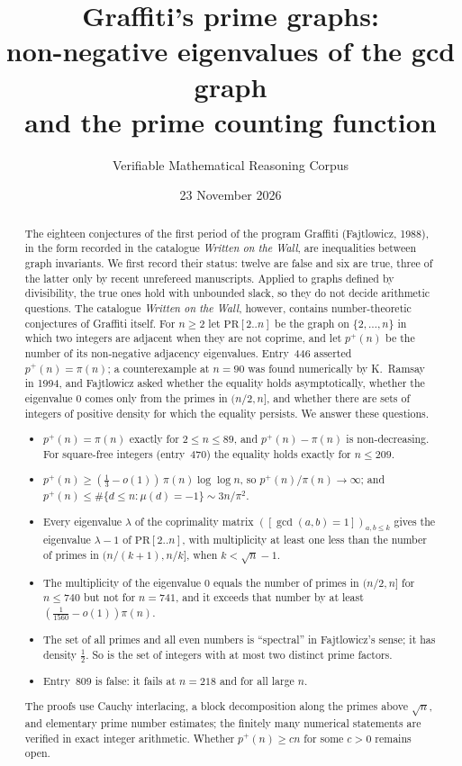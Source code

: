 \documentclass[11pt]{amsart}
\title[Graffiti's prime graphs]{Graffiti's prime graphs:\\ non-negative eigenvalues of the gcd graph\\ and the prime counting function}
\author{Verifiable Mathematical Reasoning Corpus}
\date{23 November 2026}
\theoremstyle{definition}
\theoremstyle{remark}
\newcommand{\PR}{\mathrm{PR}}
\newcommand{\pp}{p^{+}}
\begin{document}
\begin{abstract}
The eighteen conjectures of the first period of the program Graffiti (Fajtlowicz, 1988), in the form recorded in the catalogue \emph{Written on the Wall}, are inequalities between graph invariants. We first record their status: twelve are false and six are true, three of the latter only by recent unrefereed manuscripts. Applied to graphs defined by divisibility, the true ones hold with unbounded slack, so they do not decide arithmetic questions. The catalogue \emph{Written on the Wall}, however, contains number-theoretic conjectures of Graffiti itself. For $n\ge2$ let $\PR[2..n]$ be the graph on $\{2,\dots,n\}$ in which two integers are adjacent when they are not coprime, and let $\pp(n)$ be the number of its non-negative adjacency eigenvalues. Entry~446 asserted $\pp(n)=\pi(n)$; a counterexample at $n=90$ was found numerically by K.~Ramsay in 1994, and Fajtlowicz asked whether the equality holds asymptotically, whether the eigenvalue $0$ comes only from the primes in $(n/2,n]$, and whether there are sets of integers of positive density for which the equality persists. We answer these questions.
\begin{itemize}[leftmargin=*]
\item $\pp(n)=\pi(n)$ exactly for $2\le n\le 89$, and $\pp(n)-\pi(n)$ is non-decreasing. For square-free integers (entry~470) the equality holds exactly for $n\le209$.
\item $\pp(n)\ge(\tfrac13-o(1))\,\pi(n)\log\log n$, so $\pp(n)/\pi(n)\to\infty$; and $\pp(n)\le\#\{d\le n:\mu(d)=-1\}\sim 3n/\pi^2$.
\item Every eigenvalue $\lambda$ of the coprimality matrix $([\gcd(a,b)=1])_{a,b\le k}$ gives the eigenvalue $\lambda-1$ of $\PR[2..n]$, with multiplicity at least one less than the number of primes in $(n/(k+1),n/k]$, when $k<\sqrt n-1$.
\item The multiplicity of the eigenvalue $0$ equals the number of primes in $(n/2,n]$ for $n\le740$ but not for $n=741$, and it exceeds that number by at least $(\tfrac1{1560}-o(1))\pi(n)$.
\item The set of all primes and all even numbers is ``spectral'' in Fajtlowicz's sense; it has density $\tfrac12$. So is the set of integers with at most two distinct prime factors.
\item Entry~809 is false: it fails at $n=218$ and for all large $n$.
\end{itemize}
The proofs use Cauchy interlacing, a block decomposition along the primes above $\sqrt n$, and elementary prime number estimates; the finitely many numerical statements are verified in exact integer arithmetic. Whether $\pp(n)\ge cn$ for some $c>0$ remains open.
\end{abstract}
\end{document}
